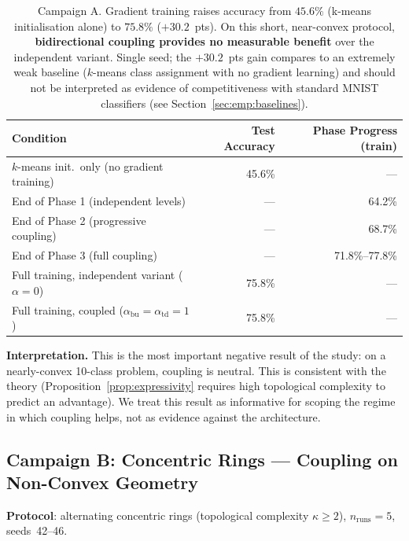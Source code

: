 \documentclass[11pt,a4paper]{article}
\begin{document}
\begin{table}[h]
\centering
\small
\begin{tabular}{lrr}
\toprule
\textbf{Condition} & \textbf{Test Accuracy} & \textbf{Phase Progress (train)} \\
\midrule
$k$-means init.\ only (no gradient training)       & 45.6\% & --- \\
End of Phase 1 (independent levels)                & ---    & 64.2\% \\
End of Phase 2 (progressive coupling)              & ---    & 68.7\% \\
End of Phase 3 (full coupling)                     & ---    & 71.8\%--77.8\% \\
Full training, independent variant ($\alpha=0$)    & 75.8\% & --- \\
Full training, coupled ($\alpha_{\mathrm{bu}}=\alpha_{\mathrm{td}}=1$) & 75.8\% & --- \\
\bottomrule
\end{tabular}
\caption{Campaign A. Gradient training raises accuracy from $45.6\%$ (k-means
initialisation alone) to $75.8\%$ ($+30.2$~pts). On this short, near-convex protocol,
\textbf{bidirectional coupling provides no measurable benefit} over the independent
variant. Single seed; the $+30.2$~pts gain compares to an extremely weak baseline
($k$-means class assignment with no gradient learning) and should not be interpreted as
evidence of competitiveness with standard MNIST classifiers (see
Section~\ref{sec:emp:baselines}).}
\label{tab:campaign_a}
\end{table}

\textbf{Interpretation.} This is the most important negative result of the study: on a
nearly-convex 10-class problem, coupling is neutral. This is consistent with the theory
(Proposition~\ref{prop:expressivity} requires high topological complexity to predict an
advantage). We treat this result as informative for scoping the regime in which coupling
helps, not as evidence against the architecture.

\subsection{Campaign B: Concentric Rings --- Coupling on Non-Convex Geometry}
\label{sec:emp:rings}

\textbf{Protocol}: alternating concentric rings (topological complexity $\kappa \ge 2$),
$n_{\mathrm{runs}}=5$, seeds~42--46.
\end{document}
